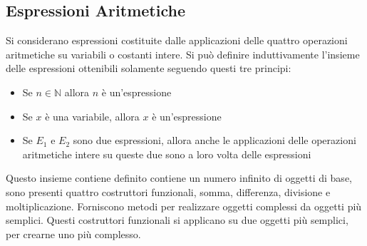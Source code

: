 \documentclass{article}
\numberwithin{equation}{subsection}
\begin{document}
\subsection{Espressioni Aritmetiche}

Si considerano espressioni costituite dalle applicazioni delle quattro operazioni aritmetiche su variabili o costanti intere. Si può definire induttivamente l'insieme delle espressioni ottenibili solamente seguendo questi tre principi:
\begin{itemize}
    \item Se $n\in\mathbb{N}$ allora $n$ è un'espressione
    \item Se $x$ è una variabile, allora $x$ è un'espressione
    \item Se $E_1$ e $E_2$ sono due espressioni, allora anche le applicazioni delle operazioni aritmetiche intere su queste due sono a loro volta delle espressioni
\end{itemize}
Questo insieme contiene definito contiene un numero infinito di oggetti di base, sono presenti quattro costruttori funzionali, somma, differenza, divisione e moltiplicazione. Forniscono metodi per realizzare oggetti complessi da oggetti più semplici. Questi costruttori funzionali si applicano su due oggetti più semplici, per crearne uno più complesso. 
\end{document}
